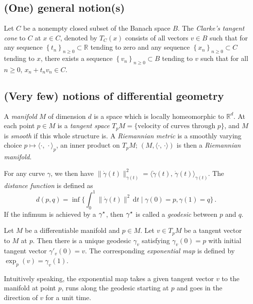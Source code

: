 \subsection{(One) general notion(s)}
\begin{defi}
    \label{def:tangent-cone}
    Let $C$ be a nonempty closed subset of the Banach space $B$. The \emph{Clarke's tangent cone} to $C$ at $x\in C$, denoted by ${T}_{C}(x)$ consists of all vectors $v\in B$ such that for any sequence $\left\{ t_{n} \right\}_{n\geq 0}\subset \mathbb{R}$ tending to zero and any sequence $\left\{ x_{n} \right\}_{n\geq 0}\subset C$ tending to $x$, there exists a sequence $\left\{ v_{n} \right\}_{n\geq 0}\subset B$ tending to $v$ such that for all $n\geq 0$, $x_{n}+t_{n}v_{n}\in C$.
\end{defi}
\subsection{(Very few) notions of differential geometry}
\begin{defi}
    A \emph{manifold} $M$ of dimension $d$ is a space which is locally homeomorphic to $\mathbb{R}^d$. At each point $p \in M$ is a \emph{tangent space} $T_pM=\{ \text{velocity of curves through }p \}$, and $M$ is \emph{smooth} if this whole structure is. A \emph{Riemannian metric} is a smoothly varying choice $p\mapsto \langle \cdot,\,\cdot\rangle_{p}$, an inner product on $T_pM$; $(M,\langle \cdot,\,\cdot\rangle)$ is then a \emph{Riemannian manifold}.

    For any curve $\gamma$, we then have $\|\dot{\gamma}(t)\|^{2}_{\gamma(t)}=\langle \dot{\gamma}(t),\,\dot{\gamma}(t)\rangle_{\gamma(t)}$. The \emph{distance function} is defined as $$d(p,q)=\inf\{ \int_0^1 \|\dot{\gamma}(t)\|^{2} \, \mathrm dt\mid \gamma(0)=p,\gamma(1)=q \}\,.$$ If the infimum is achieved by a $\gamma ^\star$, then $\gamma ^\star$ is called a \emph{geodesic} between $p$ and $q$.
    \end{defi}
\begin{defi}
    \label{def:exp}
    Let $M$ be a differentiable manifold and $p\in M$. Let $v\in T_pM$ be a tangent vector to $M$ at $p$. Then there is a unique geodesic $\gamma_v$ satisfying $\gamma_v(0) = p$ with initial tangent vector $\gamma'_v(0) = v$. The corresponding \emph{exponential map} is defined by $\exp_p(v) = \gamma_v(1)$.
\end{defi}
Intuitively speaking, the exponential map takes a given tangent vector $v$ to the manifold at point $p$, runs along the geodesic starting at $p$ and goes in the direction of $v$ for a unit time.



